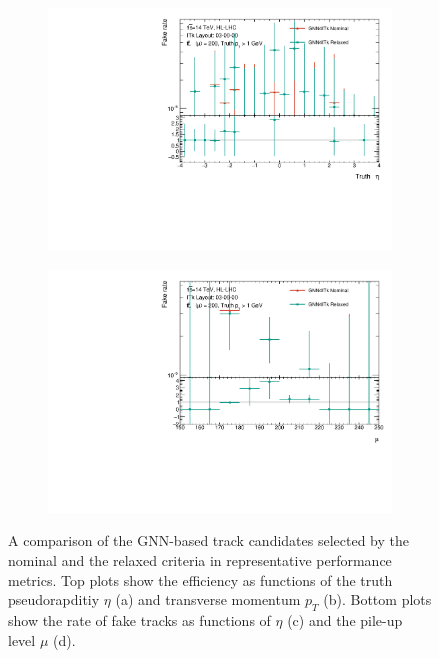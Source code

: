 \begin{figure}[h!]
\begin{subfigure}{0.49\textwidth}
    \includegraphics[width=\textwidth]{figures/nominal-vs-relaxed-cuts/FakeRate/fakerate_vs_eta.pdf}
    \caption{}
    \label{subfig:nominal-vs-relaxed-fake}
\end{subfigure}
\begin{subfigure}{0.49\textwidth}
    \centering
    \includegraphics[width=\textwidth]{figures/nominal-vs-relaxed-cuts/FakeRate/fakerate_vs_mu.pdf}
    \caption{}
    \label{subfig:nominal-vs-relaxed-fake-mu}
\end{subfigure}
    \caption{A comparison of the GNN-based track candidates selected by the nominal and the relaxed criteria in representative performance metrics. Top plots show the efficiency as functions of the truth pseudorapditiy $\eta$ (a) and transverse momentum $p_T$ (b). Bottom plots show the rate of fake tracks as functions of $\eta$ (c) and the pile-up level $\mu$ (d).}
    \label{fig:nominal-vs-relaxed}
\end{figure}

